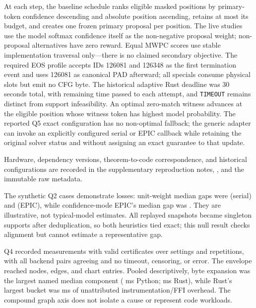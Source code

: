At each step, the baseline schedule ranks eligible masked positions by primary-token confidence descending and absolute position ascending, retains at most its budget, and creates one frozen primary proposal per position. The live studies use the model softmax confidence itself as the non-negative proposal weight; non-proposal alternatives have zero reward. Equal MWPC scores use stable implementation traversal only---there is no claimed secondary objective. The required EOS profile accepts IDs 126081 and 126348 as the first termination event and uses 126081 as canonical PAD afterward; all specials consume physical slots but emit no CFG byte. The historical adaptive Rust deadline was 30 seconds total, with remaining time passed to each attempt, and \texttt{TIMEOUT} remains distinct from support infeasibility. An optimal zero-match witness advances at the eligible position whose witness token has highest model probability. The reported Q5 exact configuration has no non-optimal fallback; the generic adapter can invoke an explicitly configured serial or EPIC callback while retaining the original solver status and without assigning an exact guarantee to that update.



Hardware, dependency versions, theorem-to-code correspondence, and historical configurations are recorded in the supplementary reproduction notes, , and the immutable raw metadata.


\begingroup\let\scriptsize\footnotesize

\endgroup

The synthetic Q2 cases demonstrate losses: unit-weight median gaps were \MThirteenQTwoUnitSerialGap{} (serial) and \MThirteenQTwoUnitEpicGap{} (EPIC), while confidence-mode EPIC's median gap was \MThirteenQTwoConfidenceEpicGap{}. They are illustrative, not typical-model estimates. All \MThirteenQTwoRealSnapshots{} replayed snapshots became singleton supports after deduplication, so both heuristics tied exact; this null result checks alignment but cannot estimate a representative gap.


Q4 recorded \MThirteenQFourMeasurements{} measurements with valid certificates over \MThirteenQFourPoints{} settings and \MThirteenQFourRepetitions{} repetitions, with all \MThirteenQFourComparisons{} backend pairs agreeing and no timeout, censoring, or error. The envelope reached \MThirteenQFourMaxNodes{} nodes, \MThirteenQFourMaxEdges{} edges, and \MThirteenQFourMaxChart{} chart entries. Pooled descriptively, byte expansion was the largest named median component (\MThirteenQFourPythonNamedMs{} ms Python; \MThirteenQFourRustNamedMs{} ms Rust), while Rust's largest bucket was \MThirteenQFourRustOverheadMs{} ms of unattributed instrumentation/FFI overhead. The compound graph axis does not isolate a cause or represent code workloads.

